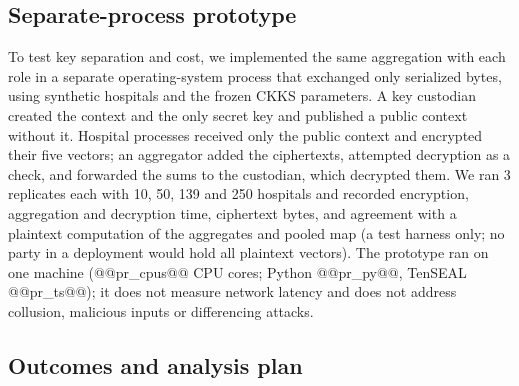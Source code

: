 \documentclass[11pt]{article}
\begin{document}
\subsection*{Separate-process prototype}\label{prototype-methods}

To test key separation and cost, we implemented the same aggregation with each role in a separate operating-system process that exchanged only serialized bytes, using synthetic hospitals and the frozen CKKS parameters. A key custodian created the context and the only secret key and published a public context without it. Hospital processes received only the public context and encrypted their five vectors; an aggregator added the ciphertexts, attempted decryption as a check, and forwarded the sums to the custodian, which decrypted them. We ran 3 replicates each with 10, 50, 139 and 250 hospitals and recorded encryption, aggregation and decryption time, ciphertext bytes, and agreement with a plaintext computation of the aggregates and pooled map (a test harness only; no party in a deployment would hold all plaintext vectors). The prototype ran on one machine (@@pr_cpus@@ CPU cores; Python @@pr_py@@, TenSEAL @@pr_ts@@); it does not measure network latency and does not address collusion, malicious inputs or differencing attacks.

\subsection*{Outcomes and analysis plan}\label{outcomes-and-analysis-plan}
\end{document}
